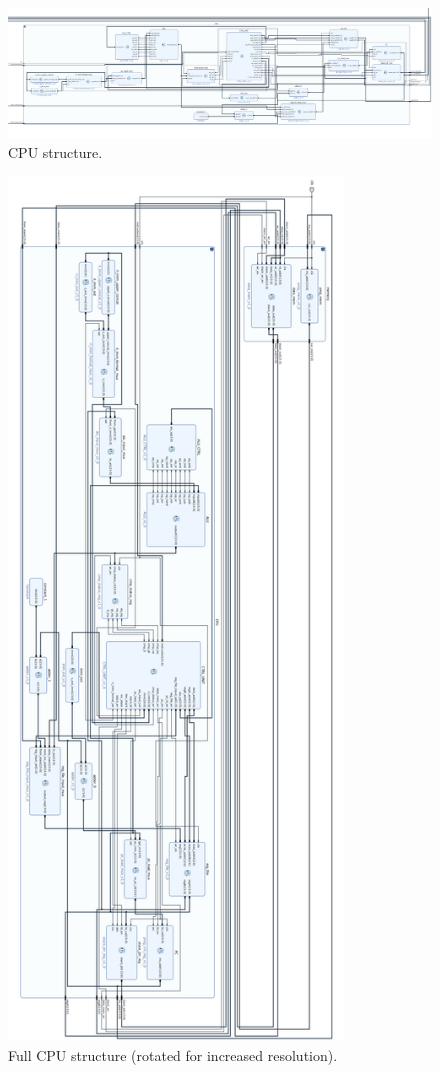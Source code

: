 \documentclass{article}
\begin{document}
\begin{par}
	\begin{figure}[H]
		\centering
		\includegraphics[width=7in]{img/cpuov.png}
		\caption{CPU structure.}
	\end{figure}

	\begin{figure}[H]
		\centering
		\includegraphics[width=3.5in]{img/dsf.png}
		\caption{Full CPU structure (rotated for increased resolution).}
	\end{figure}
	
\end{par}
\end{document}

